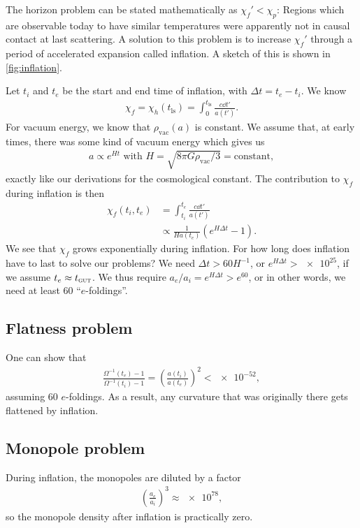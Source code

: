 The horizon problem can be stated mathematically as $\chi_f' < \chi_p$: Regions which are observable today to have similar temperatures were apparently not in causal contact at last scattering. A solution to this problem is to increase $\chi_f'$ through a period of accelerated expansion called inflation. A sketch of this is shown in \cref{fig:inflation}.

Let $t_i$ and $t_e$ be the start and end time of inflation, with $\Delta t = t_e - t_i$. We know
\begin{align*}
	\chi_f = \chi_h(t_\text{ls})
	= \int_0^{t_\text{ls}} \frac{c \dd{t'}}{a(t')}.
\end{align*}
For vacuum energy, we know that $\rho_\text{vac}(a)$ is constant. We assume that, at early times, there was some kind of vacuum energy which gives us
\begin{align*}
	a \propto e^{Ht} \text{ with } 
	H = \sqrt{8 \pi G \rho_\text{vac}/3} = \text{constant},
\end{align*}
exactly like our derivations for the cosmological constant.
The contribution to $\chi_f$ during inflation is then
\begin{align*}
	\chi_f(t_i,t_e)
	&= \int_{t_i}^{t_e} \frac{c \dd{t'}}{a(t')}\\
	&\propto \frac{1}{H a(t_e)} (e^{H \Delta t} - 1).
\end{align*}
We see that $\chi_f$ grows exponentially during inflation. For how long does inflation have to last to solve our problems? We need $\Delta t > 60 H^{-1}$, or $e^{H \Delta t} > \num{e25}$, if we assume $t_e \approx t_\textsc{gut}$. We thus require $a_e/a_i = e^{H \Delta t} > e^{60}$, or in other words, we need at least $60$ \enquote{$e$-foldings}.


\subsection{Flatness problem}
One can show that
\begin{align*}
	\frac{\Omega^{-1}(t_e)-1}{\Omega^{-1}(t_i)-1}
	= \left( \frac{a(t_i)}{a(t_e)} \right)^2
	< \num{e-52},
\end{align*}
assuming $60$ $e$-foldings. As a result, any curvature that was originally there gets flattened by inflation.

\subsection{Monopole problem}
During inflation, the monopoles are diluted by a factor
\begin{align*}
	\left( \frac{a_e}{a_i} \right)^3 \approx \num{e78},
\end{align*}
so the monopole density after inflation is practically zero.

